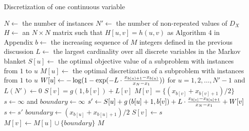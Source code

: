 \begin{algorithm}
\caption{ Discretization of one continuous variable}\label{euclid}
\begin{algorithmic}[5]
\State
\State $N \leftarrow$ the number of instances
\State $N' \leftarrow$ the number of non-repeated values of $D_X$
\State $H \leftarrow$ an $N \times N$ matrix such that $H[u,v] = h(u,v)$ as Algorithm 4 in Appendix
\State $b \leftarrow$ the increasing sequence of $M$ integers defined in the previous discussion
\State $L \leftarrow$ the largest cardinality over all discrete variables in the Markov blanket
\State $S[u] \leftarrow$ the optimal objective value of a subproblem with instances from $1$ to $u$
\State $M[u] \leftarrow$ the optimal discretization of a subproblem with instances from $1$ to $u$
\State $W[u]  \leftarrow - \log(1 - {\exp(- L \cdot{ {{x_{b(u)+1} - x_{b(u)}}\over{x_N - x_1}})}})$ for $u = 1,2, \ldots,N'-1$ and $L(N') \leftarrow 0$
\State 
{}
\State $S[v] = g \left(1,b[v] \right) + L[v]$
\State $M[v] = \{ ({x_{b[v]} + x_{b[v]+1}}) / 2\}$
\Else
\State $s \leftarrow \infty$ and $boundary \leftarrow \infty$
\State $s' \leftarrow S[u] + g \left( b[u]+1,b[v] \right) +  {L \cdot {{x_{b[v]} - x_{b[u] + 1}}\over{x_N - x_1}}} + W[v]$
\State $s \leftarrow s'$
\State $boundary \leftarrow ({x_{b[u]} + x_{b[u]+1}}) / 2$
\EndIf
\EndFor
\State $S[v] \leftarrow s$
\State $M[v] \leftarrow M[u] \cup \{ boundary\}$
\EndIf
\EndFor
 \State \Return $M$
\EndFunction
\end{algorithmic}
\end{algorithm}


